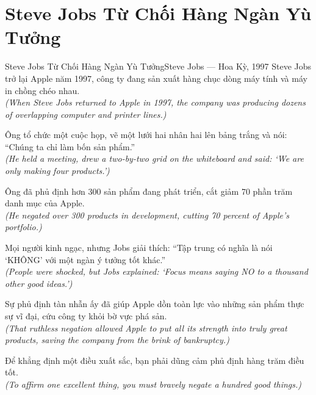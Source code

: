 \section{Steve Jobs Từ Chối Hàng Ngàn Yù Tưởng}
\begin{truyen}{Steve Jobs Từ Chối Hàng Ngàn Yù Tưởng}{Steve Jobs --- Hoa Kỳ, 1997}
 Steve Jobs trở lại Apple năm 1997, công ty đang sản xuất hàng chục dòng máy tính và máy in chồng chéo nhau.\\[4pt]
\textit{(When Steve Jobs returned to Apple in 1997, the company was producing dozens of overlapping computer and printer lines.)}

Ông tổ chức một cuộc họp, vẽ một lưới hai nhân hai lên bảng trắng và nói: ``Chúng ta chỉ làm bốn sản phẩm.''\\[4pt]
\textit{(He held a meeting, drew a two-by-two grid on the whiteboard and said: `We are only making four products.')}

Ông đã phủ định hơn 300 sản phẩm đang phát triển, cắt giảm 70 phần trăm danh mục của Apple.\\[4pt]
\textit{(He negated over 300 products in development, cutting 70 percent of Apple's portfolio.)}

Mọi người kinh ngạc, nhưng Jobs giải thích: ``Tập trung có nghĩa là nói `KHÔNG' với một ngàn ý tưởng tốt khác.''\\[4pt]
\textit{(People were shocked, but Jobs explained: `Focus means saying NO to a thousand other good ideas.')}

Sự phủ định tàn nhẫn ấy đã giúp Apple dồn toàn lực vào những sản phẩm thực sự vĩ đại, cứu công ty khỏi bờ vực phá sản.\\[4pt]
\textit{(That ruthless negation allowed Apple to put all its strength into truly great products, saving the company from the brink of bankruptcy.)}

\end{truyen}
\begin{baihoc}
  Để khẳng định một điều xuất sắc, bạn phải dũng cảm phủ định hàng trăm điều tốt.\\[4pt]
  \textit{(To affirm one excellent thing, you must bravely negate a hundred good things.)}
\end{baihoc}

